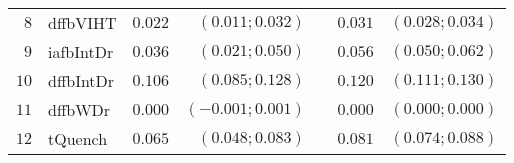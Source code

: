 \begin{table*}[!ht]
\begin{tabular*}{\textwidth}{@{}rlrrrrr@{}}
\footnotesize{$8 $} & \footnotesize{dffbVIHT } & \footnotesize{$0.022$}   & \footnotesize{$(0.011;0.032)$}  && \footnotesize{$0.031$} & \footnotesize{$(0.028;0.034)$} \\
\footnotesize{$9 $} & \footnotesize{iafbIntDr} & \footnotesize{$0.036$}   & \footnotesize{$(0.021;0.050)$}  && \footnotesize{$0.056$} & \footnotesize{$(0.050;0.062)$} \\
\footnotesize{$10$} & \footnotesize{dffbIntDr} & \footnotesize{$0.106$}   & \footnotesize{$(0.085;0.128)$}  && \footnotesize{$0.120$} & \footnotesize{$(0.111;0.130)$} \\
\footnotesize{$11$} & \footnotesize{dffbWDr  } & \footnotesize{$0.000$}   & \footnotesize{$(-0.001;0.001)$}  && \footnotesize{$0.000$} & \footnotesize{$(0.000;0.000)$} \\
\footnotesize{$12$} & \footnotesize{tQuench  } & \footnotesize{$0.065$}   & \footnotesize{$(0.048;0.083)$}  && \footnotesize{$0.081$} & \footnotesize{$(0.074;0.088)$} \\

\bottomrule
\end{tabular*}
\end{table*}

